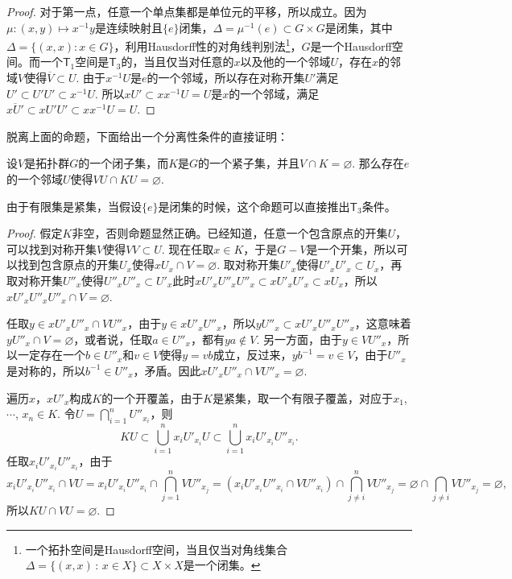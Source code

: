\begin{proof}
	对于第一点，任意一个单点集都是单位元的平移，所以成立。因为$\mu:(x,y)\mapsto x^{-1}y$是连续映射且$\{e\}$闭集，$\Delta=\mu^{-1}(e)\subset G\times G$是闭集，其中$\Delta=\{(x,x):x\in G\}$，利用Hausdorff性的对角线判别法\footnote{一个拓扑空间是Hausdorff空间，当且仅当对角线集合$\Delta=\{(x,x)\,:\,x\in X\}\subset X\times X$是一个闭集。}，$G$是一个Hausdorff空间。而一个$\mathsf{T}_1$空间是$\mathsf{T}_3$的，当且仅当对任意的$x$以及他的一个邻域$U$，存在$x$的邻域$V$使得$\overline{V}\subset U$. 由于$x^{-1}U$是$e$的一个邻域，所以存在对称开集$U'$满足$U'\subset U'U'\subset x^{-1}U$. 所以$xU'\subset xx^{-1}U=U$是$x$的一个邻域，满足$\overline{xU'}\subset xU'U'\subset xx^{-1}U=U$.
\end{proof}

脱离上面的命题，下面给出一个分离性条件的直接证明：

\begin{pro}
设$V$是拓扑群$G$的一个闭子集，而$K$是$G$的一个紧子集，并且$V\cap K=\varnothing$. 那么存在$e$的一个邻域$U$使得$VU\cap KU=\varnothing$.
\end{pro}

由于有限集是紧集，当假设$\{e\}$是闭集的时候，这个命题可以直接推出$\mathsf{T}_3$条件。

\begin{proof}
	假定$K$非空，否则命题显然正确。已经知道，任意一个包含原点的开集$U$，可以找到对称开集$V$使得$VV\subset U$. 现在任取$x\in K$，于是$G-V$是一个开集，所以可以找到包含原点的开集$U_x$使得$xU_x\cap V=\varnothing$. 取对称开集$U'_x$使得$U'_xU'_x\subset U_x$，再取对称开集$U''_x$使得$U''_xU''_x\subset U'_x$此时$xU'_xU''_xU''_x\subset xU'_xU'_x\subset xU_x$，所以$xU'_xU''_xU''_x\cap V=\varnothing$. 

	任取$y\in xU'_xU''_x\cap VU''_x$，由于$y\in xU'_xU''_x$，所以$yU''_x\subset xU'_xU''_xU''_x$，这意味着$yU''_x\cap V=\varnothing$，或者说，任取$a\in U''_x$，都有$ya\not\in V$. 另一方面，由于$y\in VU''_x$，所以一定存在一个$b\in U''_x$和$v\in V$使得$y=vb$成立，反过来，$yb^{-1}=v\in V$，由于$U''_x$是对称的，所以$b^{-1}\in U''_x$，矛盾。因此$xU'_xU''_x\cap VU''_x=\varnothing$.

	遍历$x$，$xU'_x$构成$K$的一个开覆盖，由于$K$是紧集，取一个有限子覆盖，对应于$x_1$, $\cdots$, $x_n\in K$. 令$U=\bigcap_{i=1}^n U''_{x_i}$，则
	\[
	KU\subset \bigcup_{i=1}^n {x_i}U'_{x_i}U\subset \bigcup_{i=1}^n x_iU'_{x_i}U''_{x_i}.
	\]
	任取$x_iU'_{x_i}U''_{x_i}$，由于
	\[
		x_iU'_{x_i}U''_{x_i}\cap VU=x_iU'_{x_i}U''_{x_i}\cap \bigcap_{j=1}^n VU''_{x_j}=(x_iU'_{x_i}U''_{x_i}\cap VU''_{x_i})\cap \bigcap_{j\neq i}^n VU''_{x_j}=\varnothing \cap \bigcap_{j\neq i} VU''_{x_j}=\varnothing,
	\]
	所以$KU\cap VU=\varnothing$.
\end{proof}

